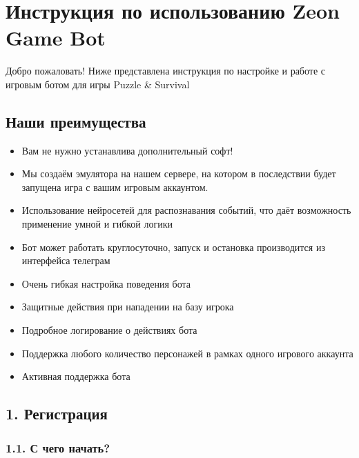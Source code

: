 \documentclass[
]{article}
\author{}
\date{}
\providecommand{\tightlist}{%
  \setlength{\itemsep}{0pt}\setlength{\parskip}{0pt}}
\begin{document}
\section{Инструкция по использованию Zeon Game
Bot}\label{ux438ux43dux441ux442ux440ux443ux43aux446ux438ux44f-ux43fux43e-ux438ux441ux43fux43eux43bux44cux437ux43eux432ux430ux43dux438ux44e-zeon-game-bot}

Добро пожаловать! Ниже представлена инструкция по настройке и работе с
игровым ботом для игры Puzzle \& Survival

\subsection{Наши
преимущества}\label{ux43dux430ux448ux438-ux43fux440ux435ux438ux43cux443ux449ux435ux441ux442ux432ux430}

\begin{itemize}
\tightlist
\item
  Вам не нужно устанавлива дополнительный софт!
\item
  Мы создаём эмулятора на нашем сервере, на котором в последствии будет
  запущена игра с вашим игровым аккаунтом.
\item
  Использование нейросетей для распознавания событий, что даёт
  возможность применение умной и гибкой логики
\item
  Бот может работать круглосуточно, запуск и остановка производится из
  интерфейса телеграм
\item
  Очень гибкая настройка поведения бота
\item
  Защитные действия при нападении на базу игрока
\item
  Подробное логирование о действиях бота
\item
  Поддержка любого количество персонажей в рамках одного игрового
  аккаунта
\item
  Активная поддержка бота
\end{itemize}

\subsection{1.
Регистрация}\label{ux440ux435ux433ux438ux441ux442ux440ux430ux446ux438ux44f}

\subsubsection{1.1. С чего
начать?}\label{ux441-ux447ux435ux433ux43e-ux43dux430ux447ux430ux442ux44c}
\end{document}
